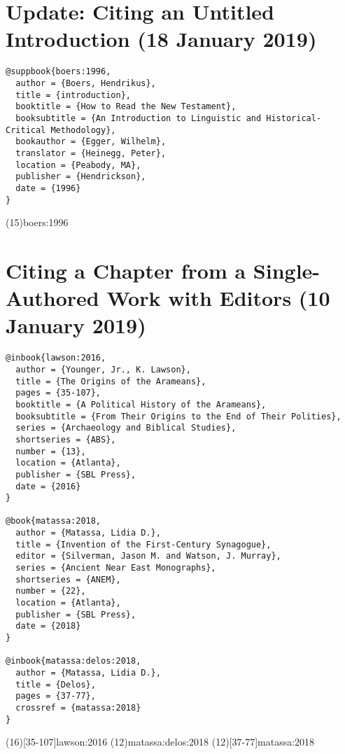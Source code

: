\documentclass[a4paper]{article}
\begin{document}
\section{Update: Citing an Untitled Introduction (18 January 2019)}

\begin{verbatim}
@suppbook{boers:1996,
  author = {Boers, Hendrikus},
  title = {introduction},
  booktitle = {How to Read the New Testament},
  booksubtitle = {An Introduction to Linguistic and Historical-Critical Methodology},
  bookauthor = {Egger, Wilhelm},
  translator = {Heinegg, Peter},
  location = {Peabody, MA},
  publisher = {Hendrickson},
  date = {1996}
}
\end{verbatim}

\examplecite(15){boers:1996}
\examplebibliography
{}

\section{Citing a Chapter from a Single-Authored Work with Editors (10 January 2019)}

\begin{verbatim}
@inbook{lawson:2016,
  author = {Younger, Jr., K. Lawson},
  title = {The Origins of the Arameans},
  pages = {35-107},
  booktitle = {A Political History of the Arameans},
  booksubtitle = {From Their Origins to the End of Their Polities},
  series = {Archaeology and Biblical Studies},
  shortseries = {ABS},
  number = {13},
  location = {Atlanta},
  publisher = {SBL Press},
  date = {2016}
}

@book{matassa:2018,
  author = {Matassa, Lidia D.},
  title = {Invention of the First-Century Synagogue},
  editor = {Silverman, Jason M. and Watson, J. Murray},
  series = {Ancient Near East Monographs},
  shortseries = {ANEM},
  number = {22},
  location = {Atlanta},
  publisher = {SBL Press},
  date = {2018}
}

@inbook{matassa:delos:2018,
  author = {Matassa, Lidia D.},
  title = {Delos},
  pages = {37-77},
  crossref = {matassa:2018}
}
\end{verbatim}

\examplecite(16)[35-107]{lawson:2016}
\examplecite(12){matassa:delos:2018}
\citereset
\examplecite(12)[37-77]{matassa:2018}
\exampleabbreviations
\examplebibliography
{}
\end{document}
